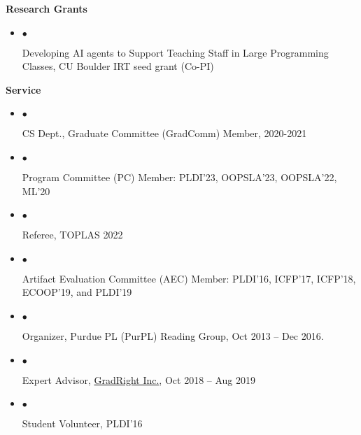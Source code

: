 \documentclass[10pt]{article}
\newcommand{\lbar}[1]{{\color{#1}\ding{118}}\hspace*{2pt}}
\newcommand{\service}[1]{\item $\bullet$ \hspace{1ex}\parbox{7.2in}{#1}}
\newenvironment{itemregion}[1]{
  \vspace*{0.5ex}
  {{\textbf{\large{#1}}}}
  \begin{itemize}\itemsep1pt}
  {\end{itemize}\vspace{0.8ex}}
\begin{document}


\begin{itemregion} {\lbar{Mahogany} Research Grants}
  \service{Developing AI agents to Support Teaching Staff in Large
  Programming Classes, CU Boulder IRT seed grant (Co-PI)}
\end{itemregion}

\begin{itemregion} {\lbar{Mahogany}Service}
  \service{CS Dept., Graduate Committee (GradComm) Member, 2020-2021}
  \service{Program Committee (PC) Member: PLDI'23, OOPSLA'23, OOPSLA'22, ML'20}
  \service{Referee, TOPLAS 2022}
  \service{Artifact Evaluation Committee (AEC) Member: PLDI'16,
      ICFP'17, ICFP'18, ECOOP'19, and PLDI'19}
  \service{Organizer, Purdue PL (PurPL) Reading Group, Oct 2013 -- Dec 2016.}
  \service{Expert Advisor, \href{http://gradright.com}{GradRight Inc.}, Oct 2018 -- Aug 2019}
  \service{Student Volunteer, PLDI'16}
\end{itemregion}

\ifdefined\genrefs

\newpage
\end{document}

